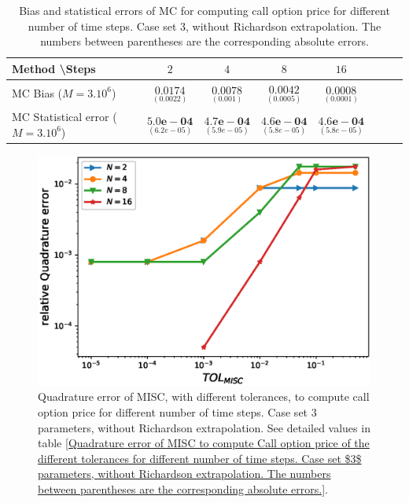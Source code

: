 \begin{table}[h!]
	\centering
	\begin{tabular}{l*{6}{c}r}
		Method \textbackslash  Steps            & $2$ & $4$ & $8$ & $16$  \\
		\hline
		MC Bias ($M=3.10^6$)   & 	$ \underset{(    0.0022)}{\mathbf{0.0174}}$  & $\underset{(0.001)}{\mathbf{0.0078}}$  & $\underset{(0.0005)}{\mathbf{0.0042}}$ & $\underset{(0.0001)}{\mathbf{0.0008}}$\\ 
		
		MC Statistical error ($M=3.10^6$)  &  $\underset{(   6.2e-05)} {\mathbf{5.0e-04}}$  & $\underset{(5.9e-05)} {\mathbf{4.7e-04}}$  & $\underset{(5.8e-05)} {\mathbf{4.6e-04 }}$ & $\underset{(5.8e-05)} {\mathbf{4.6e-04 }}$	\\
		
		\hline
	\end{tabular}
	\caption{Bias and statistical errors of MC   for computing call option price  for different number of time steps. Case set $3$, without Richardson extrapolation. The numbers between parentheses are the corresponding absolute errors.}
	\label{Bias and Statistical errors of MC ($M=10^6$)  for computing Call option price  for different number of time steps. Case set 3, without Richardson extrapolation. The numbers between parentheses are the corresponding absolute errors.}
\end{table}




\FloatBarrier

	\begin{figure}[h!]
		\centering
		\includegraphics[width=0.4\linewidth]{./figures/rBergomi_MISC_quadratre_error/vs_TOL/set5/relative_quad_error_wrt_MISC_TOL_set5_non_rich}
	
	
	\caption{Quadrature error of MISC, with different tolerances, to compute call option price  for different number of time steps. Case  set $3$ parameters, without Richardson extrapolation.  See detailed values  in table \ref{Quadrature error of MISC to compute Call option price of the different tolerances for different number of time steps. Case  set $3$ parameters, without Richardson extrapolation. The numbers between parentheses are the corresponding absolute errors.}.}
	\label{fig:Quadrature_error_set3}
\end{figure}

